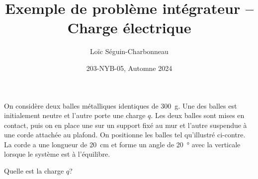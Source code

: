 \documentclass[nofonts]{tufte-handout}
\title{Exemple de problème intégrateur -- Charge électrique}
\author{Loïc Séguin-Charbonneau}
\date{203-NYB-05, Automne 2024}
\begin{document}
\maketitle

\begin{marginfigure}[10\baselineskip]
\end{marginfigure}

On considère deux balles métalliques identiques de \qty{300}{g}. Une des balles
est initialement neutre et l'autre porte une charge $q$. Les deux balles sont
mises en contact, puis on en place une sur un support fixé au mur et l'autre
suspendue à une corde attachée au plafond. On positionne les balles tel
qu'illustré ci-contre. La corde a une longueur de \qty{20}{cm} et forme un
angle de \qty{20}{\degree} avec la verticale lorsque le système est à l'équilibre.

Quelle est la charge $q$?
\end{document}

